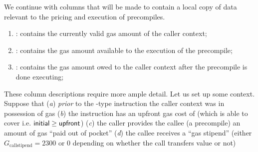 \begin{enumerate}[resume]
\end{enumerate}
We continue with columns that will be made to contain a local copy of data relevant to the pricing and execution of precompiles.
\begin{enumerate}[resume]
	\item \scenPrcCurrentlyValidCallerGas:
		contains the currently valid gas amount of the caller context; 
	\item \scenPrcGasAllowance:
		contains the gas amount available to the execution of the precompile;
	\item \scenPrcGasOwedToCaller:
		contains the gas amount owed to the caller context after the precompile is done executing; 
\end{enumerate}
These column descriptions require more ample detail.
Let us set up some context.
Suppose that
(\emph{a}) \emph{prior} to the -type instruction the caller context was in possession of \hereInitial{} gas
(\emph{b}) the instruction has an upfront gas cost of \hereUpfront{} (which \hereInitial{} is able to cover i.e. $\textsf{initial} \geq \textsf{upfront}$)
(\emph{c}) the caller provides the callee (a precompile) an amount \herePoop{} of gas ``paid out of pocket''
(\emph{d}) the callee receives a ``gas stipend'' \hereStipend{} (either $G_\text{callstipend} = 2300$ or $0$ depending on whether the call transfers value or not)

